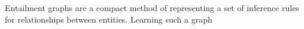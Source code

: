 



Entailment graphs are a compact method of representing 
a set of inference rules for relationships between
entities. Learning such a graph 


% 


% 
%
%
%
%
